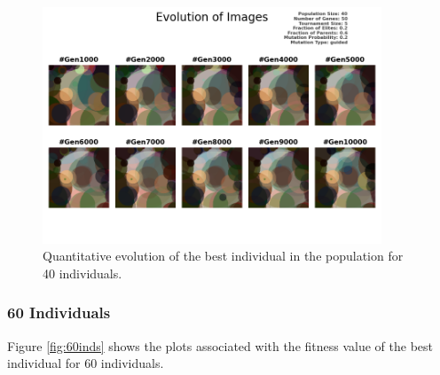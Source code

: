 \documentclass{assignment}
\begin{document}
\begin{figure}[!htb]
    \centering
    \includegraphics[width=0.9\textwidth]{figures/images_output_40_50_5_0.2_0.6_0.2_guided.png}
    \caption{Quantitative evolution of the best individual in the population for 40 individuals.}
    \label{fig:40inds_image}
\end{figure}

\subsubsection{60 Individuals}

Figure \ref{fig:60inds} shows the plots associated with the fitness value of the best individual for 60 individuals.
\end{document}
